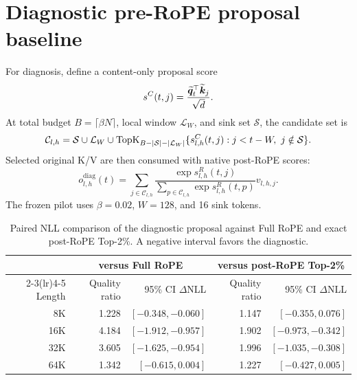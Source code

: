 \section{Diagnostic pre-RoPE proposal baseline}
\label{app:diagnostic-retrieval}

For diagnosis, define a content-only proposal score
\begin{equation}
  s^C(t,j)=\frac{\widetilde{\bm q}_t^\top\widetilde{\bm k}_j}{\sqrt d}.
  \label{eq:content-score}
\end{equation}
At total budget $B=\lceil\beta N\rceil$, local window $\mathcal L_W$, and sink
set $\mathcal S$, the candidate set is
\begin{equation}
  \mathcal C_{l,h}=\mathcal S\cup\mathcal L_W\cup
  \operatorname{TopK}_{B-|\mathcal S|-|\mathcal L_W|}
  \{s^C_{l,h}(t,j):j<t-W,\ j\notin\mathcal S\}.
  \label{eq:candidate-set}
\end{equation}
Selected original K/V are then consumed with native post-RoPE scores:
\begin{equation}
  o^{\mathrm{diag}}_{l,h}(t)=
  \sum_{j\in\mathcal C_{l,h}}
  \frac{\exp s^R_{l,h}(t,j)}
  {\sum_{p\in\mathcal C_{l,h}}\exp s^R_{l,h}(t,p)}v_{l,h,j}.
  \label{eq:diagnostic-attention}
\end{equation}
The frozen pilot uses $\beta=0.02$, $W=128$, and 16 sink tokens.

\begin{table}[h]
  \caption{Paired NLL comparison of the diagnostic proposal against Full RoPE
  and exact post-RoPE Top-2\%.  A negative interval favors the diagnostic.}
  \centering
  \small
  \begin{tabular}{r rr rr}
    \toprule
    & \multicolumn{2}{c}{versus Full RoPE}
    & \multicolumn{2}{c}{versus post-RoPE Top-2\%}\\
    \cmidrule(lr){2-3}\cmidrule(lr){4-5}
    Length & Quality ratio & 95\% CI $\Delta$NLL
           & Quality ratio & 95\% CI $\Delta$NLL\\
    \midrule
    8K  & 1.228 & $[-0.348,-0.060]$ & 1.147 & $[-0.355,0.076]$\\
    16K & 4.184 & $[-1.912,-0.957]$ & 1.902 & $[-0.973,-0.342]$\\
    32K & 3.605 & $[-1.625,-0.954]$ & 1.996 & $[-1.035,-0.308]$\\
    64K & 1.342 & $[-0.615,0.004]$  & 1.227 & $[-0.427,0.005]$\\
    \bottomrule
  \end{tabular}
\end{table}

